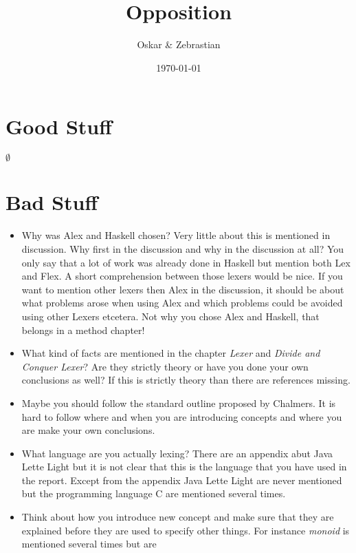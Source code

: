 \documentclass{article}
\title{Opposition}
\author{Oskar \& Zebrastian}
\begin{document}
\date{\today}
\maketitle

\section*{Good Stuff}
$\emptyset$
\section*{Bad Stuff}
\begin{itemize}
\item Why was Alex and Haskell chosen? Very little about this is mentioned in
discussion. Why first in the discussion and why in the discussion at all? You
only say that a lot of work was already done in Haskell but mention both Lex and
Flex. A short comprehension between those lexers would be nice. If you want to
mention other lexers then Alex in the discussion, it should be about
what problems arose when using Alex and which problems could be avoided using
other Lexers etcetera.
Not why you chose Alex and Haskell, that belongs in a method chapter!
\item What kind of facts are mentioned in the chapter \emph{Lexer} and
\emph{Divide and Conquer Lexer}? Are they strictly theory or have you done
your own conclusions as well? If this is strictly theory than there are
references missing.
\item Maybe you should follow the standard outline proposed by
Chalmers. It is hard to follow where and when you are introducing concepts and
where you are make your own conclusions.
\item What language are you actually lexing? There are an appendix abut Java
Lette Light but it is not clear that this is the language that you have used in
the report. Except from the appendix Java Lette Light are never mentioned but
the programming language C are mentioned several times.
\item Think about how you introduce new concept and make sure that they are
explained before they are used to specify other things. For instance
\emph{monoid} is mentioned several times but are
\end{itemize}
\end{document}
